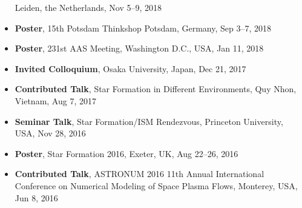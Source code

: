 \documentclass[11pt,letterpaper,roman]{moderncv}        %
\begin{document}
\begin{itemize}
  Leiden, the Netherlands, Nov 5--9, 2018
\item \textbf{Poster},
  15th Potsdam Thinkshop
  Potsdam, Germany, Sep 3--7, 2018
\item \textbf{Poster},
  231st AAS Meeting, Washington D.C., USA, Jan 11, 2018
\item \textbf{Invited Colloquium},
  Osaka University, Japan, Dec 21, 2017
\item \textbf{Contributed Talk},
  Star Formation in Different Environments, Quy Nhon, Vietnam, Aug 7, 2017
\item \textbf{Seminar Talk},
  Star Formation/ISM Rendezvous, Princeton University, USA, Nov 28, 2016
\item \textbf{Poster},
  Star Formation 2016, Exeter, UK, Aug 22--26, 2016
\item \textbf{Contributed Talk},
  ASTRONUM 2016 11th Annual International Conference on Numerical Modeling of Space Plasma Flows, Monterey, USA, Jun 8, 2016

\end{itemize}
\end{document}
